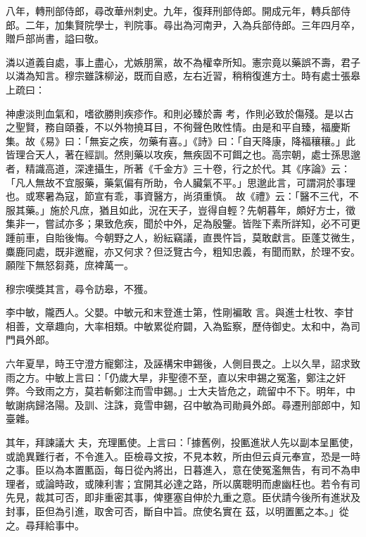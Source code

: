 \begin{pinyinscope}
 八年，轉刑部侍郎，尋改華州刺史。九年，復拜刑部侍郎。開成元年，轉兵部侍郎。二年，加集賢院學士，判院事。尋出為河南尹，入為兵部侍郎。三年四月卒，贈戶部尚書，謚曰敬。



 潾以道義自處，事上盡心，尤嫉朋黨，故不為權幸所知。憲宗竟以藥誤不壽，君子以潾為知言。穆宗雖誅柳泌，既而自惑，左右近習，稍稍復進方士。時有處士張皋上疏曰：



 神慮淡則血氣和，嗜欲勝則疾疹作。和則必臻於壽
 考，作則必致於傷殘。是以古之聖賢，務自頤養，不以外物撓耳目，不徇聲色敗性情。由是和平自臻，福慶斯集。故《易》曰：「無妄之疾，勿藥有喜。」《詩》曰：「自天降康，降福穰穰。」此皆理合天人，著在經訓。然則藥以攻疾，無疾固不可餌之也。高宗朝，處士孫思邈者，精識高道，深達攝生，所著《千金方》三十卷，行之於代。其《序論》云：「凡人無故不宜服藥，藥氣偏有所助，令人臟氣不平。」思邈此言，可謂洞於事理也。或寒暑為寇，節宣有乖，事資醫方，尚須重慎。
 故《禮》云：「醫不三代，不服其藥。」施於凡庶，猶且如此，況在天子，豈得自輕？先朝暮年，頗好方士，徵集非一，嘗試亦多；果致危疾，聞於中外，足為殷鑒。皆陛下素所詳知，必不可更踵前車，自貽後悔。今朝野之人，紛紜竊議，直畏忤旨，莫敢獻言。臣蓬艾微生，麋鹿同處，既非邀寵，亦又何求？但泛覽古今，粗知忠義，有聞而默，於理不安。願陛下無怒芻蕘，庶裨萬一。



 穆宗嘆獎其言，尋令訪皋，不獲。



 李中敏，隴西人。父嬰。中敏元和末登進士第，性剛褊敢
 言。與進士杜牧、李甘相善，文章趣向，大率相類。中敏累從府闢，入為監察，歷侍御史。太和中，為司門員外郎。



 六年夏旱，時王守澄方寵鄭注，及誣構宋申錫後，人側目畏之。上以久旱，詔求致雨之方。中敏上言曰：「仍歲大旱，非聖德不至，直以宋申錫之冤濫，鄭注之奸弊。今致雨之方，莫若斬鄭注而雪申錫。」士大夫皆危之，疏留中不下。明年，中敏謝病歸洛陽。及訓、注誅，竟雪申錫，召中敏為司勛員外郎。尋遷刑部郎中，知臺雜。



 其年，拜諫議大
 夫，充理匭使。上言曰：「據舊例，投匭進狀人先以副本呈匭使，或詭異難行者，不令進入。臣檢尋文按，不見本敕，所由但云貞元奉宣，恐是一時之事。臣以為本置匭函，每日從內將出，日暮進入，意在使冤濫無告，有司不為申理者，或論時政，或陳利害；宜開其必達之路，所以廣聰明而慮幽枉也。若令有司先見，裁其可否，即非重密其事，俾壅塞自伸於九重之意。臣伏請今後所有進狀及封事，臣但為引進，取舍可否，斷自中旨。庶使名實在
 茲，以明置匭之本。」從之。尋拜給事中。




\end{pinyinscope}
